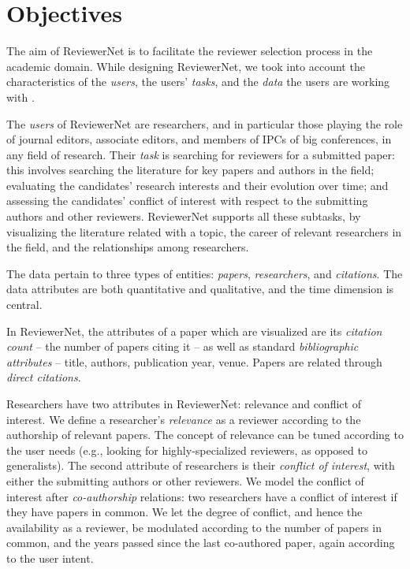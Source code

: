 \chapter{Objectives}\label{sec:methods} %

The aim of ReviewerNet is to facilitate the reviewer selection process in the academic domain. While designing ReviewerNet, we took into account the characteristics of the \emph{users}, the users' \emph{tasks}, and the \emph{data} the users are working with \cite{MiAi14}. 

The \emph{users} of ReviewerNet are researchers, and in particular those playing the role of journal editors, associate editors, and members of IPCs of big conferences, in any field of research. Their \emph{task} is searching for reviewers for a submitted paper: this involves searching the literature for key papers and authors in the field; evaluating the candidates' research interests and their evolution over time; and assessing the candidates' conflict of interest with respect to the submitting authors and other reviewers. ReviewerNet supports all these subtasks, by visualizing the literature related with a topic, the career of relevant researchers in the field, and the relationships among researchers. 

The data pertain to three types of entities: \emph{papers}, \emph{researchers}, and \emph{citations}. The data attributes are both quantitative and qualitative, and the time dimension is central. 

In ReviewerNet, the attributes of a paper which are visualized are its \emph{citation count} -- the number of papers citing it -- as well as standard \emph{bibliographic attributes} -- title, authors, publication year, venue. Papers are related through \emph{direct citations}. 

Researchers have two attributes in ReviewerNet: relevance and conflict of interest. We define a researcher's \emph{relevance} as a reviewer according to the authorship of relevant papers. The concept of relevance can be tuned according to the user needs (e.g., looking for highly-specialized reviewers, as opposed to generalists). The second attribute of researchers is their \emph{conflict of interest}, with either the submitting authors or other reviewers. We model the conflict of interest after \emph{co-authorship} relations: two researchers have a conflict of interest if they have papers in common. We let the degree of conflict, and hence the availability as a reviewer, be modulated according to the number of papers in common, and the years passed since the last co-authored paper, again according to the user intent. 

